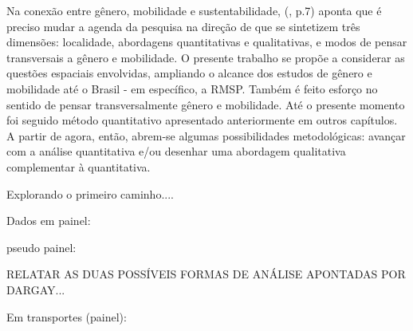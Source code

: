 

Na conexão entre gênero, mobilidade e sustentabilidade,  (\citeyear{HANSON2010}, p.7) aponta que é preciso mudar a agenda da pesquisa na direção de que se sintetizem três dimensões: localidade, abordagens quantitativas e qualitativas, e modos de pensar transversais a gênero e mobilidade. O presente trabalho se propõe a considerar as questões espaciais envolvidas, ampliando o alcance dos estudos de gênero e mobilidade até o Brasil - em específico, a RMSP. Também é feito esforço no sentido de pensar transversalmente gênero e mobilidade. Até o presente momento foi seguido método quantitativo apresentado anteriormente em outros capítulos. A partir de agora, então, abrem-se algumas possibilidades metodológicas: avançar com a análise quantitativa e/ou desenhar uma abordagem qualitativa complementar à quantitativa.

Explorando o primeiro caminho....



Dados em painel: \cite{DEATON1985,VERBEEK1992,VERBEEK1992,WOOLDRIDGE2002,FAVERO2013}

pseudo painel: \cite{WARUNSIRI2010,MENG2014,NETTO2014,NETTO2014a}

RELATAR AS DUAS POSSÍVEIS FORMAS DE ANÁLISE APONTADAS POR DARGAY...

Em transportes (painel): \cite{HANSON1985,MOFFITT1993,WIZEMAN2001,LANZENDORF2005,THOGERSEN2006,TRB2006,GLAESER2008,DIANA2010,SENER2011,
SCHEINER2013,COMPTOM2014,DICIOMMO2014,PERCHOUX2014,RASOULI2014}

